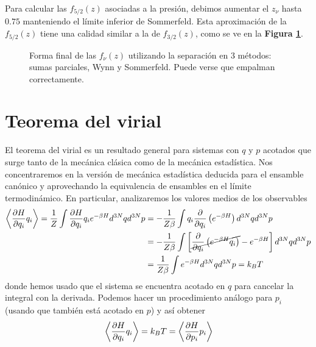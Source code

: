 Para calcular las $f_{5/2}(z)$ asociadas a la presión, debimos aumentar el $z_\nu$ hasta $0.75$ manteniendo el límite inferior de Sommerfeld.
Esta aproximación de la $f_{5/2}(z)$ tiene una calidad similar a la de $f_{3/2}(z)$, como se ve en la \textbf{Figura \ref{fig:f32_f52}}.

\begin{figure}[H]
	\centering
	\caption{Forma final de las $f_\nu(z)$ utilizando la separación en 3 métodos: sumas parciales, Wynn y Sommerfeld. Puede verse que empalman correctamente.}
	\label{fig:f32_f52}
\end{figure}

\newpage

\section{Teorema del virial}{\label{ap:teo_virial}}

El teorema del virial es un resultado general para sistemas con $q$ y $p$ acotados que surge tanto de la mecánica clásica como de la mecánica estadística.
Nos concentraremos en la versión de mecánica estadística deducida para el ensamble canónico y aprovechando la equivalencia de ensambles en el límite termodinámico.
En particular, analizaremos los valores medios de los observables
\begin{align*}
\left< \frac{\partial H}{\partial q_i}q_i \right> = \frac{1}{Z}\int \frac{\partial H}{\partial q_i}q_i e^{-\beta H} d^{3N}qd^{3N}p  &= -\frac{1}{Z\beta}\int q_i \frac{\partial}{\partial q_i}\left(e^{-\beta H}\right) d^{3N}qd^{3N}p \\
&= -\frac{1}{Z\beta}\int \left[ \cancel{\frac{\partial}{\partial q_i}\left(e^{-\beta H} q_i\right)} - e^{-\beta H} \right] d^{3N}qd^{3N}p \\
&= \frac{1}{Z\beta}\int  e^{-\beta H} d^{3N}qd^{3N}p = k_B T
\end{align*}
donde hemos usado que el sistema se encuentra acotado en $q$ para cancelar la integral con la derivada.
Podemos hacer un procedimiento análogo para $p_i$ (usando que también está acotado en $p$) y así obtener
\begin{equation}{\label{eq:teo_virial_T}}
  \left< \frac{\partial H}{\partial q_i}q_i \right> = k_B T = \left< \frac{\partial H}{\partial p_i}p_i \right>
\end{equation}

